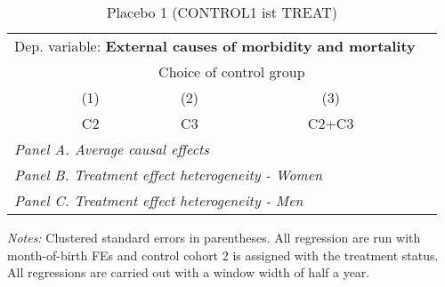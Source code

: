  \begin{table}[H] \centering \begin{threeparttable} \caption{Placebo 1 (CONTROL1 ist TREAT) } {\def\sym#1{\ifmmode^{#1}\else\(^{#1}\)\fi} \begin{tabular}{l*{4}{c}} \toprule \multicolumn{4}{l}{Dep. variable: \textbf{External causes of morbidity and mortality}} \\ & \multicolumn{3}{c}{Choice of control group} \\ \cmidrule(lr){2-4}
            &\multicolumn{1}{c}{(1)}&\multicolumn{1}{c}{(2)}&\multicolumn{1}{c}{(3)}\\
            &\multicolumn{1}{c}{C2}&\multicolumn{1}{c}{C3}&\multicolumn{1}{c}{C2+C3}\\
\midrule
 \multicolumn{4}{l}{\emph{Panel A. Average causal effects}} \\      \midrule\multicolumn{4}{l}{\emph{Panel B. Treatment effect heterogeneity - Women}} \\      \midrule\multicolumn{4}{l}{\emph{Panel C. Treatment effect heterogeneity - Men}} \\      
\bottomrule \end{tabular} } \begin{tablenotes} \item \scriptsize \emph{Notes:} Clustered standard errors in parentheses. All regression are run with month-of-birth FEs and control cohort 2 is assigned with the treatment status. All regressions are carried out with a window width of half a year. \end{tablenotes} \end{threeparttable} \end{table} 
